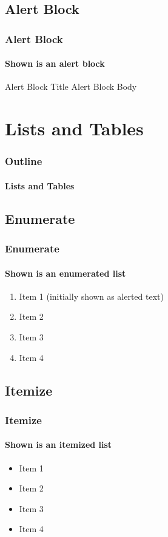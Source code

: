 \documentclass[compress, xcolor = svgnames, t]{beamer}
\begin{document}

\subsection{Alert Block} %
\label{sub:alert_block}

\begin{frame}\frametitle{Alert Block}\framesubtitle{Shown is an alert block}
\begin{alertblock}{Alert Block Title}
Alert Block Body
\end{alertblock}
\end{frame}



\section{Lists and Tables} %
\label{sec:lists}

\begin{frame}\frametitle{Outline}\framesubtitle{Lists and Tables}
\end{frame}

\subsection{Enumerate} %
\label{sub:enumerate}

\begin{frame}\frametitle{Enumerate}\framesubtitle{Shown is an enumerated list}
\begin{enumerate} 
\item<1-| alert@1> Item 1 (initially shown as alerted text)
\item<2-> Item 2
\item<3-> Item 3
\item<3-> Item 4
\end{enumerate}
\end{frame}


\subsection{Itemize} %
\label{sub:itemize}

\begin{frame}\frametitle{Itemize}\framesubtitle{Shown is an itemized list}
\begin{itemize}
\item<1-> Item 1
\item<2-> Item 2
\item<3-> Item 3
\item<4-> Item 4
\end{itemize}
\end{frame}
\end{document}
